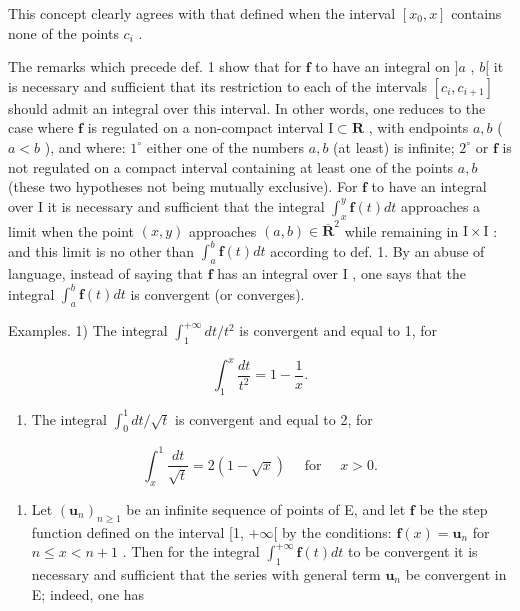 This concept clearly agrees with that defined when the interval \([x_0, x]\) contains none of the points \(c_i\) .

The remarks which precede def. 1 show that for \(\mathbf{f}\) to have an integral on \(]a\) , \(b[\) it is necessary and sufficient that its restriction to each of the intervals \([c_i, c_{i+1}]\) should admit an integral over this interval. In other words, one reduces to the case where \(\mathbf{f}\) is regulated on a non-compact interval \(\mathrm{I} \subset \mathbf{R}\) , with endpoints \(a, b\) ( \(a < b\) ), and where: \(1^\circ\) either one of the numbers \(a, b\) (at least) is infinite; \(2^\circ\) or \(\mathbf{f}\) is not regulated on a compact interval containing at least one of the points \(a, b\) (these two hypotheses not being mutually exclusive). For \(\mathbf{f}\) to have an integral over \(\mathrm{I}\) it is necessary and sufficient that the integral \(\int_x^y \mathbf{f}(t) dt\) approaches a limit when the point \((x, y)\) approaches \((a, b) \in \overline{\mathbf{R}}^2\) while remaining in \(\mathrm{I} \times \mathrm{I}\) : and this limit is no other than \(\int_a^b \mathbf{f}(t) dt\) according to def. 1. By an abuse of language, instead of saying that \(\mathbf{f}\) has an integral over \(\mathrm{I}\) , one says that the integral \(\int_a^b \mathbf{f}(t) dt\) is convergent (or converges).

Examples. 1) The integral \(\int_{1}^{+\infty} dt / t^{2}\) is convergent and equal to 1, for

\[
\int_ {1} ^ {x} \frac {d t}{t ^ {2}} = 1 - \frac {1}{x}.
\]

\begin{enumerate}
\def\labelenumi{\arabic{enumi})}
\setcounter{enumi}{1}
\tightlist
\item
  The integral \(\int_0^1 dt / \sqrt{t}\) is convergent and equal to 2, for
\end{enumerate}

\[
\int_ {x} ^ {1} \frac {d t}{\sqrt {t}} = 2 (1 - \sqrt {x}) \quad \text { for } \quad x > 0.
\]

\begin{enumerate}
\def\labelenumi{\arabic{enumi})}
\setcounter{enumi}{2}
\tightlist
\item
  Let \((\mathbf{u}_n)_{n\geqslant 1}\) be an infinite sequence of points of E, and let \(\mathbf{f}\) be the step function defined on the interval {[}1, \(+\infty[\) by the conditions: \(\mathbf{f}(x) = \mathbf{u}_n\) for \(n\leqslant x < n + 1\) . Then for the integral \(\int_1^{+\infty}\mathbf{f}(t)dt\) to be convergent it is necessary and sufficient that the series with general term \(\mathbf{u}_n\) be convergent in E; indeed, one has
\end{enumerate}

